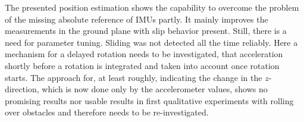 \documentclass[letterpaper, 10 pt, conference]{ieeeconf}  %
\begin{document}
The presented position estimation shows the capability to overcome the problem of the missing absolute reference of IMUs partly.
It mainly improves the measurements in the ground plane with slip behavior present.
Still, there is a need for parameter tuning. 
Sliding was not detected all the time reliably.
Here a mechanism for a delayed rotation needs to be investigated, that acceleration shortly before a rotation is integrated and taken into account once rotation starts.
The approach for, at least roughly, indicating the change in the $z$-direction, which is now done only by the accelerometer values, shows no promising results nor usable results in first qualitative experiments with rolling over obstacles and therefore needs to be re-investigated.




\addtolength{\textheight}{-12cm}   %



















\end{document}
